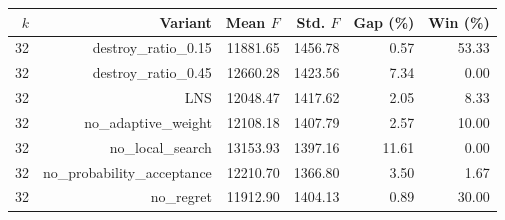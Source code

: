 \begin{tabular}{rrrrrr}
\toprule
$k$ & Variant & Mean $F$ & Std. $F$ & Gap (\%) & Win (\%) \\
\midrule
32 & destroy\_ratio\_0.15 & 11881.65 & 1456.78 & 0.57 & 53.33 \\
32 & destroy\_ratio\_0.45 & 12660.28 & 1423.56 & 7.34 & 0.00 \\
32 & LNS & 12048.47 & 1417.62 & 2.05 & 8.33 \\
32 & no\_adaptive\_weight & 12108.18 & 1407.79 & 2.57 & 10.00 \\
32 & no\_local\_search & 13153.93 & 1397.16 & 11.61 & 0.00 \\
32 & no\_probability\_acceptance & 12210.70 & 1366.80 & 3.50 & 1.67 \\
32 & no\_regret & 11912.90 & 1404.13 & 0.89 & 30.00 \\
\bottomrule
\end{tabular}
